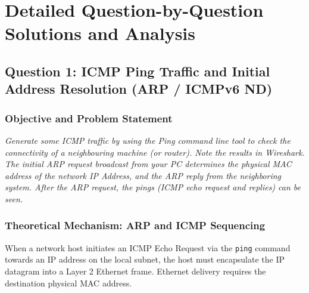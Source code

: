 \documentclass[12pt, a4paper]{article}
\begin{document}
\section{Detailed Question-by-Question Solutions and Analysis}

\subsection{Question 1: ICMP Ping Traffic and Initial Address Resolution (ARP / ICMPv6 ND)}

\subsubsection{Objective and Problem Statement}
\textit{Generate some ICMP traffic by using the Ping command line tool to check the connectivity of a neighbouring machine (or router). Note the results in Wireshark. The initial ARP request broadcast from your PC determines the physical MAC address of the network IP Address, and the ARP reply from the neighboring system. After the ARP request, the pings (ICMP echo request and replies) can be seen.}

\subsubsection{Theoretical Mechanism: ARP and ICMP Sequencing}
When a network host initiates an ICMP Echo Request via the \texttt{ping} command towards an IP address on the local subnet, the host must encapsulate the IP datagram into a Layer 2 Ethernet frame. Ethernet delivery requires the destination physical MAC address. 
\end{document}
